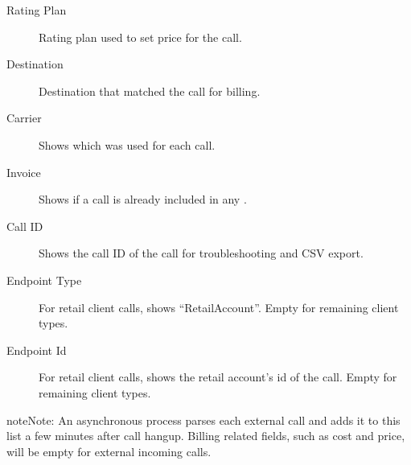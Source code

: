 \documentclass[letterpaper,10pt,english]{sphinxmanual}
\begin{document}
\begin{description}
\item[{Rating Plan}] \leavevmode{}\label{administration_portal/client/vpbx/calls/external_calls:term-rating-plan}
Rating plan used to set price for the call.

\item[{Destination}] \leavevmode{}\label{administration_portal/client/vpbx/calls/external_calls:term-destination}
Destination that matched the call for billing.

\item[{Carrier}] \leavevmode{}\label{administration_portal/client/vpbx/calls/external_calls:term-carrier}
Shows which {\hyperref[administration_portal/brand/providers/carriers:carriers]{}} was used for
each call.

\item[{Invoice}] \leavevmode{}\label{administration_portal/client/vpbx/calls/external_calls:term-invoice}
Shows if a call is already included in any {\hyperref[administration_portal/brand/invoicing/invoices:invoices]{}}.

\item[{Call ID}] \leavevmode{}\label{administration_portal/client/vpbx/calls/external_calls:term-call-id}
Shows the call ID of the call for troubleshooting and CSV export.

\item[{Endpoint Type}] \leavevmode{}\label{administration_portal/client/vpbx/calls/external_calls:term-endpoint-type}
For retail client calls, shows ``RetailAccount''. Empty for remaining client types.

\item[{Endpoint Id}] \leavevmode{}\label{administration_portal/client/vpbx/calls/external_calls:term-endpoint-id}
For retail client calls, shows the retail account's id of the call. Empty for remaining client types.

\end{description}

\begin{notice}{note}{Note:}
An asynchronous process parses each external call and adds it to this list a few minutes after call hangup. Billing related fields, such as cost and price, will be empty for external incoming calls.
\end{notice}
\end{document}
